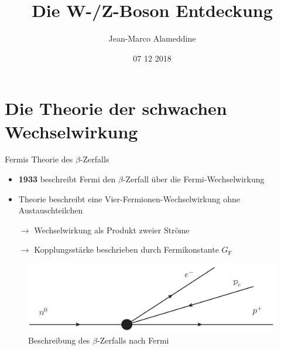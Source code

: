 \documentclass[aspectratio=1610, professionalfonts, 10pt]{beamer}
\title{Die W-/Z-Boson Entdeckung}
\author{Jean-Marco Alameddine}
\institute{TU Dortmund \\ Fakultät Physik}
\date{07 12 2018}
\begin{document}
\begin{frame}
	\maketitle %
\end{frame}

\section{Die Theorie der schwachen Wechselwirkung}

\begin{frame}{Fermis Theorie des $\beta$-Zerfalls}
			\begin{itemize}
				\setlength\itemsep{0.5em}
				\item \textbf{1933} beschreibt Fermi den $\beta$-Zerfall über die Fermi-Wechselwirkung
				\item Theorie beschreibt eine Vier-Fermionen-Wechselwirkung ohne Austauschteilchen
				\item [$\rightarrow$] Wechselwirkung als Produkt zweier Ströme
				\item [$\rightarrow$] Kopplungsstärke beschrieben durch Fermikonstante $G_\text{F}$
			\end{itemize}

			\begin{figure}
	  			\centering
				\includegraphics[width=0.9\linewidth]{Images/fourFermi_BetaDecay.png}
	  			\caption{Beschreibung des $\beta$-Zerfalls nach Fermi \cite{fermi_four}}
	  			\label{fig:fermi}
			\end{figure}
\end{frame}
\end{document}
